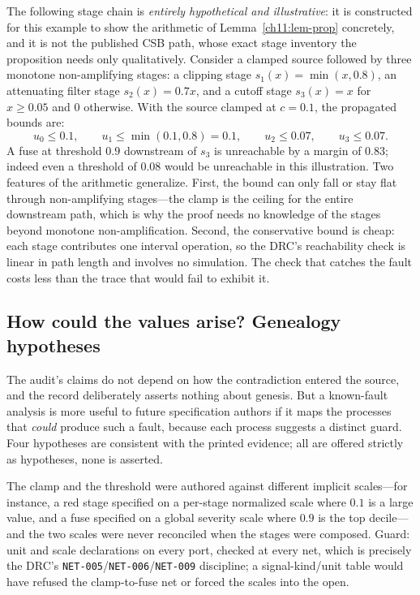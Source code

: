 \begin{example}\label{ch11:ex-bounds}
The following stage chain is \emph{entirely hypothetical and illustrative}: it is constructed for this example to show the arithmetic of Lemma~\ref{ch11:lem-prop} concretely, and it is not the published CSB path, whose exact stage inventory the proposition needs only qualitatively. Consider a clamped source followed by three monotone non-amplifying stages: a clipping stage $s_1(x)=\min(x,0.8)$, an attenuating filter stage $s_2(x)=0.7x$, and a cutoff stage $s_3(x)=x$ for $x\ge 0.05$ and $0$ otherwise. With the source clamped at $c=0.1$, the propagated bounds are:
\[
u_0\le 0.1,\qquad
u_1\le\min(0.1,0.8)=0.1,\qquad
u_2\le 0.07,\qquad
u_3\le 0.07 .
\]
A fuse at threshold $0.9$ downstream of $s_3$ is unreachable by a margin of $0.83$; indeed even a threshold of $0.08$ would be unreachable in this illustration. Two features of the arithmetic generalize. First, the bound can only fall or stay flat through non-amplifying stages---the clamp is the ceiling for the entire downstream path, which is why the proof needs no knowledge of the stages beyond monotone non-amplification. Second, the conservative bound is cheap: each stage contributes one interval operation, so the DRC's reachability check is linear in path length and involves no simulation. The check that catches the fault costs less than the trace that would fail to exhibit it.
\end{example}

\subsection{How could the values arise? Genealogy hypotheses}\label{ch11:genealogy}

The audit's claims do not depend on how the contradiction entered the source, and the record deliberately asserts nothing about genesis. But a known-fault analysis is more useful to future specification authors if it maps the processes that \emph{could} produce such a fault, because each process suggests a distinct guard. Four hypotheses are consistent with the printed evidence; all are offered strictly as hypotheses, none is asserted.

\begin{hypothesis}\label{ch11:hyp-norm}
The clamp and the threshold were authored against different implicit scales---for instance, a red stage specified on a per-stage normalized scale where $0.1$ is a large value, and a fuse specified on a global severity scale where $0.9$ is the top decile---and the two scales were never reconciled when the stages were composed. Guard: unit and scale declarations on every port, checked at every net, which is precisely the DRC's \texttt{NET-005}/\texttt{NET-006}/\texttt{NET-009} discipline; a signal-kind/unit table would have refused the clamp-to-fuse net or forced the scales into the open.
\end{hypothesis}

